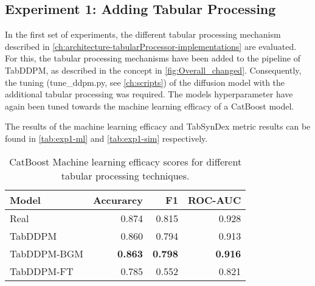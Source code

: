 \subsection[]{Experiment 1: Adding Tabular Processing}
\label{ch:Experiment-1}

In the first set of experiments, the different tabular processing mechanism described in \autoref{ch:architecture-tabularProcessor-implementations} are evaluated.
For this, the tabular processing mechanisms have been added to the pipeline of TabDDPM, as described in the concept in \autoref{fig:Overall_changed}.
Consequently, the tuning (tune\_ddpm.py, see \autoref{ch:scripts}) of the diffusion model with the additional tabular processing was required.
The models hyperparameter have again been tuned towards the machine learning efficacy of a CatBoost model.

The results of the machine learning efficacy and TabSynDex metric results can be found in \autoref{tab:exp1-ml} and \autoref{tab:exp1-sim} respectively.
\begin{table}[h]
	\centering
	\begin{tabular}{lrrr}
		\toprule
		\textbf{Model} & \textbf{Accurarcy} & \textbf{F1}    & \textbf{ROC-AUC} \\
		\midrule
		Real           & 0.874              & 0.815          & 0.928            \\
		TabDDPM        & 0.860              & 0.794          & 0.913            \\
		TabDDPM-BGM    & \textbf{0.863}     & \textbf{0.798} & \textbf{0.916}   \\
		TabDDPM-FT     & 0.785              & 0.552          & 0.821            \\
		\bottomrule
	\end{tabular}
	\caption[Experiment1-ML-Efficacy]{CatBoost Machine learning efficacy scores for different tabular processing techniques.}
	\label{tab:exp1-ml}
\end{table}


